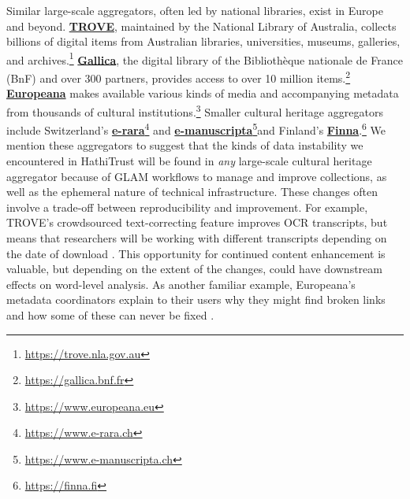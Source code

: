 \documentclass[final]{anthology-ch} %
\begin{document}
Similar large-scale aggregators, often led by national libraries, exist in Europe and beyond. \textbf{\href{https://trove.nla.gov.au/}{TROVE}}, maintained by the National Library of Australia, collects billions of digital items from Australian libraries, universities, museums, galleries, and archives.\footnote{\url{https://trove.nla.gov.au}} \textbf{\href{https://gallica.bnf.fr}{Gallica}}, the digital library of the Bibliothèque nationale de France (BnF) and over 300 partners, provides access to over 10 million items.\footnote{\url{https://gallica.bnf.fr}} \textbf{\href{https://www.europeana.eu/}{Europeana}} makes available various kinds of media and accompanying metadata from thousands of cultural institutions.\footnote{\url{https://www.europeana.eu}} Smaller cultural heritage aggregators include Switzerland’s \textbf{\href{https://www.e-rara.ch}{e-rara}}\footnote{\url{https://www.e-rara.ch}} and \textbf{\href{https://www.e-manuscripta.ch/}{e-manuscripta}}\footnote{\url{https://www.e-manuscripta.ch}}and Finland’s \textbf{\href{https://finna.fi/}{Finna}}.\footnote{\url{https://finna.fi}} We mention these aggregators to suggest that the kinds of data instability we encountered in HathiTrust will be found in \textit{any }large-scale cultural heritage aggregator because of GLAM workflows to manage and improve collections, as well as the ephemeral nature of technical infrastructure. These changes often involve a trade-off between reproducibility and improvement. For example, TROVE’s crowdsourced text-correcting feature improves OCR transcripts, but means that researchers will be working with different transcripts depending on the date of download \cite{noauthor_text_nodate}. This opportunity for continued content enhancement is valuable, but depending on the extent of the changes, could have downstream effects on word-level analysis. As another familiar example, Europeana's metadata coordinators explain to their users why they might find broken links and how some of these can never be fixed \cite{noauthor_keeping_nodate}.
\end{document}
